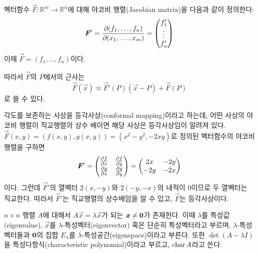 \documentclass[../engineering_mathematics_lecture_note.tex]{subfiles}
\begin{document}
\begin{definition}
    벡터함수 $\vec F: \mathbb R^m \rightarrow \mathbb R^n$에 대해 야코비 행렬(Jacobian matrix)을 다음과 같이 정의한다:
    \begin{equation*}
        \vec F' = \jacob{f_1, \dots, f_n}{x_1, \dots, x_m} =
        \begin{pmatrix}
            f_1' \\ \vdots \\ f_n'
        \end{pmatrix}
    \end{equation*}
    이때 $\vec F = (f_1, \dots, f_n)$이다.
\end{definition}

따라서 $\vec F$의 $P$에서의 근사는
\begin{equation*}
    \vec F(\vec x) \approx \vec F'(P) (\vec x - P) + \vec F(P)
\end{equation*}
로 쓸 수 있다.

\begin{example}
    각도를 보존하는 사상을 등각사상(conformal mapping)이라고 하는데, 어떤 사상의 야코비 행렬이 직교행렬의 상수 배이면 해당 사상은 등각사상임이 알려져 있다.
    $\vec F(x, y) = (f(x, y), g(x, y)) = (x^2 - y^2, -2xy)$로 정의된 벡터함수의 야코비 행렬을 구하면
    \begin{equation*}
        \vec F' =
        \begin{pmatrix}
            \diffp{f}{x} & \diffp{f}{y}\\
            \diffp{g}{x} & \diffp{g}{y}
        \end{pmatrix}
        =
        \begin{pmatrix}
            2x & -2y\\
            -2y & -2x
        \end{pmatrix}
    \end{equation*}
    이다.
    그런데 $\vec F'$의 열벡터 $2(x, -y)$와 $2(-y, -x)$의 내적이 0이므로 두 열벡터는 직교한다.
    따라서 $\vec F'$는 직교행렬의 상수배임을 알 수 있고, $\vec F$는 등각사상이다.
\end{example}

\begin{definition}
    $n \times n$ 행렬 $A$에 대해서 $A \vec x = \lambda \vec x$가 되는 $\bm{\mathit{x}} \neq \bm{\mathrm{0}}$가 존재한다.
    이때 $\lambda$를 특성값(eigenvalue), $\vec x$를 $\lambda$-특성벡터(eigenvector) 혹은 단순히 특성벡터라고 부르며, $\lambda$-특성벡터들과 $\bm{\mathrm{0}}$의 집합 $E_\lambda$를 $\lambda$-특성공간(eigenspace)이라고 부른다.
    또한 $\det (A - \lambda I)$을 특성다항식(characteristic polynomial)이라고 부르고, $\operatorname{char} A$라고 쓴다.
\end{definition}
\end{document}
